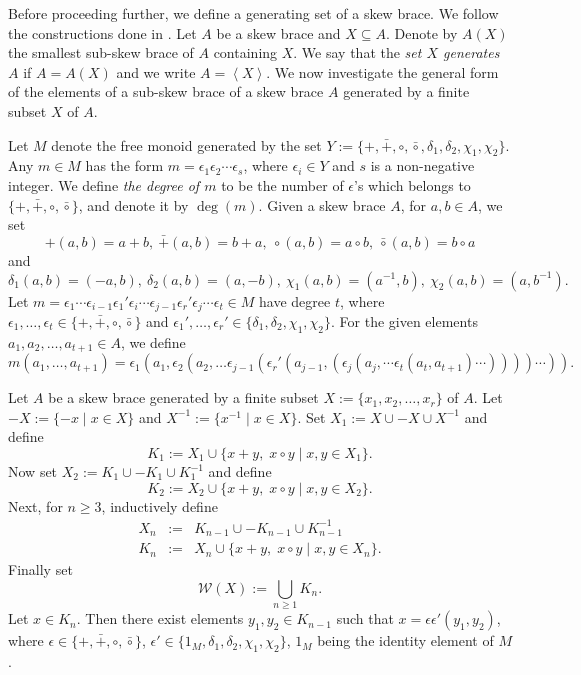 \documentclass[11pt]{amsart}
\theoremstyle{thrm}
\theoremstyle{plain}
\theoremstyle{definition}
\newcommand{\gen}[1]{\left < #1 \right >}
\numberwithin{equation}{section}
\begin{document}
Before proceeding further, we define a generating set of a skew brace. We follow the constructions done in \cite{CFT25, MT23}.  Let $A$ be a skew brace and $X \subseteq  A$.  Denote by $A(X)$ the smallest sub-skew brace of $A$ containing  $X$.  We say that the \emph{ set $X$  generates  $A$}  if  $A = A(X)$ and we write $A = \gen{X}$.  We now investigate the general form of the elements of a sub-skew brace of a skew brace $A$ generated by a finite subset  
$X$ of $A$.

Let  $M$ denote the free monoid generated by the set $Y := \{+, \bar{+}, \circ, \bar{\circ}, \delta_1,  \delta_2, \chi_1, \chi_2\}$. 
Any $m \in M$ has the form $m = \epsilon_1  \epsilon_2 \cdots  \epsilon_s$, where  $\epsilon_i \in Y$ and $s$ is a non-negative integer. 
We define \emph{the degree of $m$} to be the number of $\epsilon$'s which belongs to $\{+, \bar{+}, \circ, \bar{\circ}\}$, and denote it by $\deg(m)$. Given a skew brace $A$, for $a, b \in A$, we set 
$$+(a, b) = a+b, ~ \bar{+}(a, b) = b+a, ~ \circ(a, b) = a \circ b, ~ \bar{\circ}(a, b) = b \circ a$$
and 
$$\delta_1(a, b) = (-a, b), ~ \delta_2(a, b) = (a, -b), ~ \chi_1(a, b) = (a^{-1}, b), ~ \chi_2(a, b) = (a, b^{-1}).$$
Let $m =  \epsilon_1 \cdots \epsilon_{i-1} \epsilon_{1}' \epsilon_{i} \cdots  \epsilon_{j-1} \epsilon_{r}' \epsilon_{j} \cdots  \epsilon_t \in M$ have degree $t$, where $\epsilon_1, \ldots, \epsilon_t \in \{ +, \bar{+}, \circ, \bar{\circ}\}$ and  $\epsilon_1', \ldots,  \epsilon_{r}'  \in  
\{\delta_1, \delta_2,  \chi_1, \chi_2\}$.
For the given  elements  $a_1, a_2, \ldots, a_{t+1} \in A$, we define
\begin{equation}
m(a_1, \ldots, a_{t+1}) = \epsilon_1(a_{1}, \epsilon_2(a_2, \ldots \epsilon_{j-1}( \epsilon_{r}'(a_{j-1}, (\epsilon_j(a_j, \cdots \epsilon_t(a_t, a_{t+1}) \cdots )))) \cdots)).
\end{equation}


Let $A$ be a skew brace generated  by a finite subset $X := \{x_1, x_2, \ldots, x_r\}$ of $A$.  Let   $-X := \{-x \mid x \in X\}$ and $X^{-1} := \{x^{-1} \mid x \in X\}$. Set $X_1 := X \cup -X \cup X^{-1}$ and  define 
\[
K_{1} := X_1  \cup \{x+y,\; x \circ y \mid  x, y \in X_1\}. 
\]
Now set  $X_2 := K_1 \cup -K_1 \cup K_1^{-1}$ and define
$$K_2 := X_2  \cup \{x+y,\; x \circ y \mid  x, y \in X_2\}.$$
Next, for $n \ge 3$, inductively define
\begin{eqnarray*}
X_n &:=&  K_{n-1} \cup -K_{n-1} \cup K_{n-1}^{-1}\\
 K_n &:=& X_n \cup   \{x+y,\; x \circ y \mid  x, y \in X_n\}.
 \end{eqnarray*}
 Finally set
\[
\mathcal{W}(X):=\bigcup_{n\ge1} K_n.
\]
Let $x \in K_n$. Then there exist elements $y_1, y_2 \in K_{n-1}$ such that 
 $x = \epsilon \epsilon'(y_1, y_2)$, where $\epsilon \in   \{+, \bar{+}, \circ, \bar{\circ}\}$, $\epsilon' \in \{1_M, \delta_1, \delta_2,  \chi_1, \chi_2\}$,   $1_M$ being the  identity element of $M$.
\end{document}
